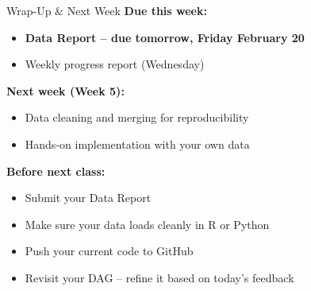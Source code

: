 \begin{frame}{Wrap-Up \& Next Week}
  \textbf{Due this week:}
  \begin{itemize}
    \item \textbf{Data Report -- due tomorrow, Friday February 20}
    \item Weekly progress report (Wednesday)
  \end{itemize}

  \vspace{10pt}

  \textbf{Next week (Week 5):}
  \begin{itemize}
    \item Data cleaning and merging for reproducibility
    \item Hands-on implementation with your own data
  \end{itemize}

  \vspace{10pt}

  \textbf{Before next class:}
  \begin{itemize}
    \item Submit your Data Report
    \item Make sure your data loads cleanly in R or Python
    \item Push your current code to GitHub
    \item Revisit your DAG -- refine it based on today's feedback
  \end{itemize}
\end{frame}


